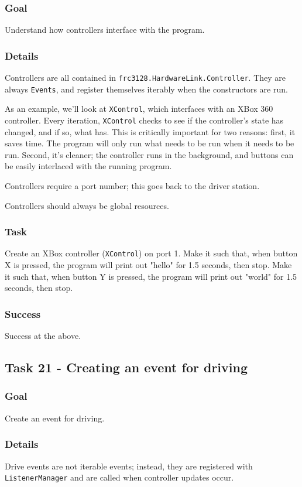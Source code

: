 \documentclass[a4paper]{article}
\begin{document}
\subsubsection{Goal} Understand how controllers interface with the program.
\subsubsection{Details} Controllers are all contained in \lstinline{frc3128.HardwareLink.Controller}. They are always \lstinline{Events}, and register themselves iterably when the constructors are run. 

As an example, we'll look at \lstinline{XControl}, which interfaces with an XBox 360 controller. Every iteration, \lstinline{XControl} checks to see if the controller's state has changed, and if so, what has. This is critically important for two reasons: first, it saves time. The program will only run what needs to be run when it needs to be run. Second, it's cleaner; the controller runs in the background, and buttons can be easily interlaced with the running program.

Controllers require a port number; this goes back to the driver station. 

Controllers should always be global resources.
\subsubsection{Task} Create an XBox controller (\lstinline{XControl}) on port 1. Make it such that, when button X is pressed, the program will print out "hello" for 1.5 seconds, then stop. Make it such that, when button Y is pressed, the program will print out "world" for 1.5 seconds, then stop.
\subsubsection{Success} Success at the above.

\subsection{Task 21 - Creating an event for driving}
\subsubsection{Goal} Create an event for driving.
\subsubsection{Details} Drive events are not iterable events; instead, they are registered with \lstinline{ListenerManager} and are called when controller updates occur. 
\end{document}

